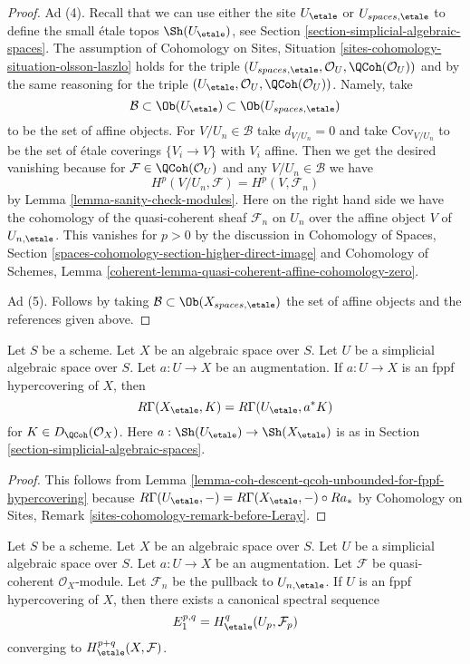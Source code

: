 \begin{proof}
\medskip\noindent
Ad (4). Recall that we can use either the site $U_\etale$ or
$U_{spaces, \etale}$ to define the small \'etale topos
$\Sh(U_\etale)$, see Section \ref{section-simplicial-algebraic-spaces}.
The assumption of
Cohomology on Sites, Situation \ref{sites-cohomology-situation-olsson-laszlo}
holds for the triple
$(U_{spaces, \etale}, \mathcal{O}_U, \QCoh(\mathcal{O}_U))$
and by the same reasoning for the triple
$(U_\etale, \mathcal{O}_U, \QCoh(\mathcal{O}_U))$.
Namely, take
$$
\mathcal{B} \subset \Ob(U_\etale) \subset \Ob(U_{spaces, \etale})
$$
to be the set of affine objects. For $V/U_n \in \mathcal{B}$
take $d_{V/U_n} = 0$ and take $\text{Cov}_{V/U_n}$ to be the set of
\'etale coverings $\{V_i \to V\}$ with $V_i$ affine.
Then we get the desired vanishing because for
$\mathcal{F} \in \QCoh(\mathcal{O}_U)$
and any $V/U_n \in \mathcal{B}$ we have
$$
H^p(V/U_n, \mathcal{F}) = H^p(V, \mathcal{F}_n)
$$
by Lemma \ref{lemma-sanity-check-modules}. Here on the
right hand side we have the cohomology of the quasi-coherent
sheaf $\mathcal{F}_n$ on $U_n$ over the affine object $V$
of $U_{n, \etale}$. This vanishes for $p > 0$ by the discussion in
Cohomology of Spaces, Section
\ref{spaces-cohomology-section-higher-direct-image} and
Cohomology of Schemes, Lemma
\ref{coherent-lemma-quasi-coherent-affine-cohomology-zero}.

\medskip\noindent
Ad (5). Follows by taking $\mathcal{B} \subset \Ob(X_{spaces, \etale})$
the set of affine objects and the references given above.
\end{proof}

\begin{lemma}
\label{lemma-compute-via-fppf-hypercovering-modules}
Let $S$ be a scheme. Let $X$ be an algebraic space over $S$.
Let $U$ be a simplicial algebraic space over $S$. Let $a : U \to X$
be an augmentation. If $a : U \to X$ is an fppf hypercovering of $X$, then
$$
R\Gamma(X_\etale, K) = R\Gamma(U_\etale, a^*K)
$$
for $K \in D_\QCoh(\mathcal{O}_X)$. Here $a : \Sh(U_\etale) \to \Sh(X_\etale)$
is as in Section \ref{section-simplicial-algebraic-spaces}.
\end{lemma}

\begin{proof}
This follows from
Lemma \ref{lemma-coh-descent-qcoh-unbounded-for-fppf-hypercovering}
because $R\Gamma(U_\etale, -) = R\Gamma(X_\etale, -) \circ Ra_*$ by
Cohomology on Sites, Remark \ref{sites-cohomology-remark-before-Leray}.
\end{proof}

\begin{lemma}
\label{lemma-spectral-sequence-fppf-hypercovering-modules}
Let $S$ be a scheme. Let $X$ be an algebraic space over $S$.
Let $U$ be a simplicial algebraic space over $S$. Let $a : U \to X$
be an augmentation. Let $\mathcal{F}$ be quasi-coherent
$\mathcal{O}_X$-module. Let $\mathcal{F}_n$ be the pullback to
$U_{n, \etale}$. If $U$ is an fppf hypercovering of $X$, then
there exists a canonical spectral sequence
$$
E_1^{p, q} = H^q_\etale(U_p, \mathcal{F}_p)
$$
converging to $H^{p + q}_\etale(X, \mathcal{F})$.
\end{lemma}

